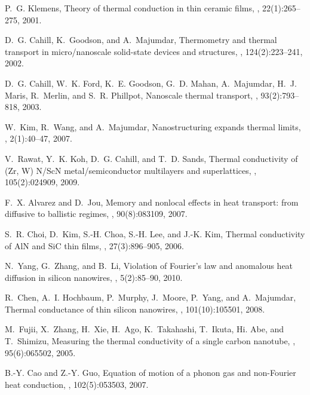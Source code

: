 \documentclass[sn-mathphys]{sn-jnl}%
\theoremstyle{thmstyleone}%
\theoremstyle{thmstyletwo}%
\theoremstyle{thmstylethree}%
\begin{document}
\begin{thebibliography}{9}
	P.~G. Klemens,
	\newblock Theory of thermal conduction in thin ceramic films,
	, 22(1):265--275, 2001.
	
	D.~G. Cahill, K.~Goodson, and A.~Majumdar,
	\newblock Thermometry and thermal transport in micro/nanoscale solid-state
	devices and structures,
	, 124(2):223--241, 2002.
	
	D.~G. Cahill, W.~K. Ford, K.~E. Goodson, G.~D. Mahan, A.~Majumdar, H.~J. Maris,
	R.~Merlin, and S.~R. Phillpot,
	\newblock Nanoscale thermal transport,
	, 93(2):793--818, 2003.
	
	W.~Kim, R.~Wang, and A.~Majumdar,
	\newblock Nanostructuring expands thermal limits,
	, 2(1):40--47, 2007.
	
	V.~Rawat, Y.~K. Koh, D.~G. Cahill, and T.~D. Sands,
	\newblock Thermal conductivity of {(Zr, W) N/ScN} metal/semiconductor
	multilayers and superlattices,
	, 105(2):024909, 2009.
	
	F.~X. Alvarez and D.~Jou,
	\newblock Memory and nonlocal effects in heat transport: from diffusive to
	ballistic regimes,
	, 90(8):083109, 2007.
	
	S.~R. Choi, D.~Kim, S.-H. Choa, S.-H. Lee, and J.-K. Kim,
	\newblock Thermal conductivity of {A}l{N} and {S}i{C} thin films,
	, 27(3):896--905, 2006.
	
	N.~Yang, G.~Zhang, and B.~Li,
	\newblock Violation of {F}ourier's law and anomalous heat diffusion in silicon
	nanowires,
	, 5(2):85--90, 2010.
	
	R.~Chen, A.~I. Hochbaum, P.~Murphy, J.~Moore, P.~Yang, and A.~Majumdar,
	\newblock Thermal conductance of thin silicon nanowires,
	, 101(10):105501, 2008.
	
	M.~Fujii, X.~Zhang, H.~Xie, H.~Ago, K.~Takahashi, T.~Ikuta, Hi. Abe, and
	T.~Shimizu,
	\newblock Measuring the thermal conductivity of a single carbon nanotube,
	, 95(6):065502, 2005.
	
	B.-Y. Cao and Z.-Y. Guo,
	\newblock Equation of motion of a phonon gas and non-{F}ourier heat conduction,
	, 102(5):053503, 2007.
	

\end{thebibliography}
\end{document}
